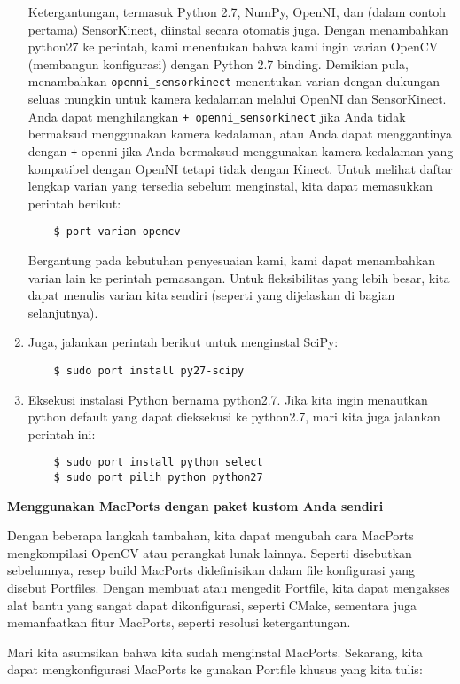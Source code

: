 \begin{enumerate}
	Ketergantungan, termasuk Python 2.7, NumPy, OpenNI, dan (dalam contoh pertama) SensorKinect, diinstal secara otomatis juga. Dengan menambahkan  python27 ke perintah, kami menentukan bahwa kami ingin varian OpenCV (membangun konfigurasi) dengan Python 2.7 binding. Demikian pula, menambahkan \verb|openni_sensorkinect| menentukan varian dengan dukungan seluas mungkin untuk kamera kedalaman melalui OpenNI dan SensorKinect. Anda dapat menghilangkan \verb|+ openni_sensorkinect| jika Anda tidak bermaksud menggunakan kamera kedalaman, atau Anda dapat menggantinya dengan \verb|+| openni jika Anda bermaksud menggunakan kamera kedalaman yang kompatibel dengan OpenNI tetapi tidak dengan Kinect. Untuk melihat daftar lengkap varian yang tersedia sebelum menginstal, kita dapat memasukkan perintah berikut:
	\begin{verbatim}
	$ port varian opencv
	\end{verbatim}
	Bergantung pada kebutuhan penyesuaian kami, kami dapat menambahkan varian lain ke perintah pemasangan. Untuk fleksibilitas yang lebih besar, kita dapat menulis varian kita sendiri (seperti yang dijelaskan di bagian selanjutnya).
	\item Juga, jalankan perintah berikut untuk menginstal SciPy:
	\begin{verbatim}
	$ sudo port install py27-scipy
	\end{verbatim}
	\item Eksekusi instalasi Python bernama python2.7. Jika kita ingin menautkan python default yang dapat dieksekusi ke python2.7, mari kita juga jalankan perintah ini:
	\begin{verbatim}
	$ sudo port install python_select
	$ sudo port pilih python python27
	\end{verbatim}
\end{enumerate}

\newpage
\textbf{Menggunakan MacPorts dengan paket kustom Anda sendiri}

Dengan beberapa langkah tambahan, kita dapat mengubah cara MacPorts mengkompilasi OpenCV atau perangkat lunak lainnya. Seperti disebutkan sebelumnya, resep build MacPorts didefinisikan dalam file konfigurasi yang disebut Portfiles. Dengan membuat atau mengedit Portfile, kita dapat mengakses alat bantu yang sangat dapat dikonfigurasi, seperti CMake, sementara juga memanfaatkan fitur MacPorts, seperti resolusi ketergantungan.

Mari kita asumsikan bahwa kita sudah menginstal MacPorts. Sekarang, kita dapat mengkonfigurasi MacPorts ke
gunakan Portfile khusus yang kita tulis:

